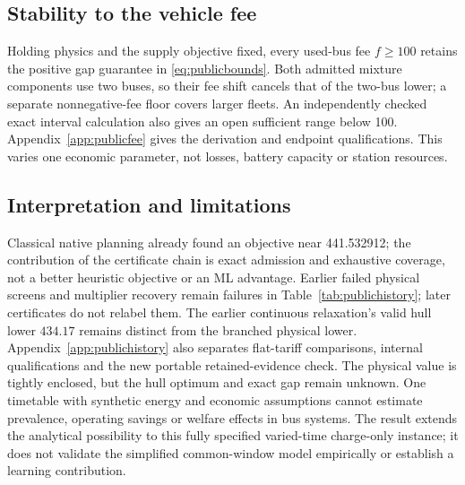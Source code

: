 \subsection{Stability to the vehicle fee}
Holding physics and the supply objective fixed, every used-bus fee
$f\ge100$ retains the positive gap guarantee in \eqref{eq:publicbounds}.
Both admitted mixture components use two buses, so their fee shift cancels
that of the two-bus lower; a separate nonnegative-fee floor covers larger
fleets. An independently checked exact interval calculation also gives an
open sufficient range below 100. Appendix~\ref{app:publicfee} gives the
derivation and endpoint qualifications. This varies one economic parameter,
not losses, battery capacity or station resources.

\subsection{Interpretation and limitations}
Classical native planning already found an objective near 441.532912;
the contribution of the certificate chain is exact admission and exhaustive
coverage, not a better heuristic objective or an ML advantage. Earlier
failed physical screens and multiplier recovery remain failures in
Table~\ref{tab:publichistory}; later certificates do not relabel them.
The earlier continuous relaxation's valid hull lower $434.17$ remains
distinct from the branched physical lower. Appendix~\ref{app:publichistory}
also separates flat-tariff comparisons, internal qualifications and the
new portable retained-evidence check. The physical value is tightly
enclosed, but the hull optimum and exact gap remain unknown.
One timetable with synthetic energy and economic assumptions cannot
estimate prevalence, operating savings or welfare effects in bus systems.
The result extends the analytical possibility to this fully specified
varied-time charge-only instance; it does not validate the simplified
common-window model empirically or establish a learning contribution.
